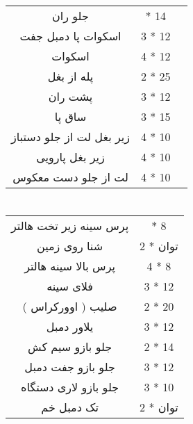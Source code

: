 \documentclass[12pt]{article}
\newcommand\myPadding{1.5}
\begin{document}
\section{}

\begin{center}
  \bgroup
  \def\arraystretch{\myPadding}%
  \begin{tabular}{ c  c  c }
جلو ران &
 { \quad 3 * 14 \quad} \\
اسکوات پا دمبل جفت &
 {3 * 12} \\
اسکوات &
 {4 * 12} \\
پله از بغل &
 {2 * 25} \\
پشت ران &
 {3 * 12} \\
ساق پا &
 {3 * 15} \\
زیر بغل لت از جلو دستباز &
 {4 * 10} \\
زیر بغل پارویی &
 {4 * 10} \\
لت از جلو دست معکوس &
 {4 * 10} \\

  \end{tabular}
  \egroup
\end{center}



\section{}



\begin{center}
  \bgroup
  \def\arraystretch{\myPadding}%
  \begin{tabular}{ c  c  }
پرس سینه زیر تخت هالتر &
 { \quad 5 * 8 \quad } \\
شنا روی زمین &
 2 * توان \\
پرس بالا سینه هالتر &
 4 * 8 \\
فلای سینه &
 3 * 12 \\
صلیب ( اوورکراس ) &
 2 * 20 \\
یلاور دمبل &
  3 * 12 \\
جلو بازو سیم کش &
 2 * 14 \\
جلو بازو جفت دمبل &
 3 * 12 \\
جلو بازو لاری دستگاه &
 3  * 10 \\
تک دمبل خم &
 2 * توان \\

  \end{tabular}
  \egroup
\end{center}
\end{document}
